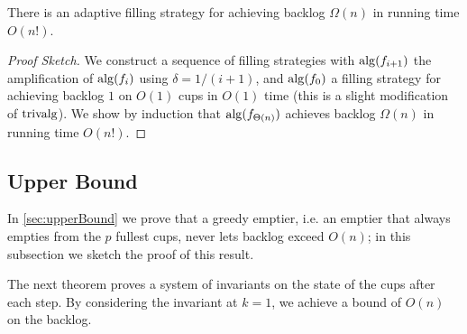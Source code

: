 \begin{theorem}
  There is an adaptive filling strategy for achieving backlog
  $\Omega(n)$ in running time $O(n!)$.
\end{theorem}
\begin{proof}[Proof Sketch]
We construct a sequence of filling strategies with $\operatorname{\text{\textup{alg}}}(f_{i+1})$ the
amplification of $\operatorname{\text{\textup{alg}}}(f_i)$ using $\delta = 1/(i+1)$, and
$\operatorname{\text{\textup{alg}}}(f_0)$ a filling strategy for achieving backlog $1$ on
$O(1)$ cups in $O(1)$ time (this is a slight modification of
$\operatorname{\text{\textup{trivalg}}}$). We show by induction that
$\operatorname{\text{\textup{alg}}}(f_{\Theta(n)})$ achieves backlog $\Omega(n)$ in running
time $O(n!)$.
\end{proof}

\subsection{Upper Bound}
In \cref{sec:upperBound} we prove that a greedy emptier, i.e. an
emptier that always empties from the $p$ fullest cups, never lets
backlog exceed $O(n)$; in this subsection we sketch the proof of
this result.

The next theorem proves a system of invariants on the state of the
cups after each step. By considering the invariant at $k = 1$, we
achieve a bound of $O(n)$ on the backlog.

